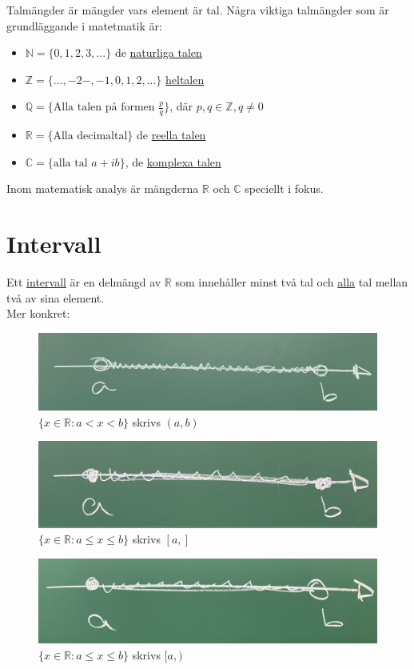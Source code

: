 Talmängder är mängder vars element är tal.
Några viktiga talmängder som är grundläggande i matetmatik är:
\begin{itemize}
    \item $\mathbb{N}=\{0,1,2,3,...\}$ de \underline{naturliga talen}
    \item $\mathbb{Z}=\{...,-2-,-1,0,1,2,...\}$ \underline{heltalen}
    \item $\mathbb{Q}=\{\text{Alla talen på formen }\frac{p}{q}\}$, där $p,q\in\mathbb{Z},q\neq 0$
    \item $\mathbb{R}=\{\text{Alla decimaltal}\}$ de \underline{reella talen}
    \item $\mathbb{C}=\{\text{alla tal }a+ib\}$, de \underline{komplexa talen}
\end{itemize}

Inom matematisk analys är mängderna $\mathbb{R}$ och $\mathbb{C}$ speciellt i fokus.

\chapter{Intervall}
Ett \underline{intervall} är en delmängd av $\mathbb{R}$ som innehåller
minst två tal och \underline{alla} tal mellan två av sina element.\\
Mer konkret:\\
\begin{figure}[h!]
    \centering
    \includegraphics[scale=0.101]{lessons/lesson01/imgs/img02.jpg}
    \caption{$\{x\in\mathbb{R}:a<x<b\}$ skrivs $(a,b)$}
\end{figure}
\begin{figure}[h!]
    \centering
    \includegraphics[scale=0.08]{lessons/lesson01/imgs/img03.jpg}
    \caption{$\{x\in\mathbb{R}:a\leq x\leq b\}$ skrivs $[a,]$}
\end{figure}
\begin{figure}[h!]
    \centering
    \includegraphics[scale=0.08]{lessons/lesson01/imgs/img04.jpg}
    \caption{$\{x\in\mathbb{R}:a\leq x\leq b\}$ skrivs $[a,)$}
\end{figure}

